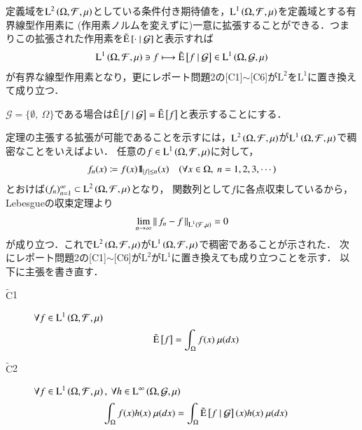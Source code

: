 	\begin{thm}[条件付き期待値の拡張]
		定義域を$\operatorname{L}^{2} \left(\Omega,\mathcal{F},\mu\right)$としている条件付き期待値を，$\operatorname{L}^{1} \left(\Omega,\mathcal{F},\mu\right)$を定義域とする有界線型作用素に
		(作用素ノルムを変えずに)一意に拡張することができる．つまりこの拡張された作用素を$\tilde{\operatorname{E}} \left[ \cdot \ \middle|\ \mathcal{G} \right]$と表示すれば
		\begin{align}
			\operatorname{L}^{1} \left(\Omega,\mathcal{F},\mu\right) \ni f \longmapsto \tilde{\operatorname{E}} \left[ f \ \middle|\ \mathcal{G} \right] \in \operatorname{L}^{1} \left(\Omega,\mathcal{G},\mu\right)
		\end{align}
		が有界な線型作用素となり，更にレポート問題2の[C1]$\sim$[C6]が$\mathrm{L}^2$を$\mathrm{L}^1$に置き換えて成り立つ．
	\end{thm}
	$\mathcal{G} = \{\emptyset,\ \Omega\}$である場合は$\tilde{\operatorname{E}} \left[ f \ \middle|\ \mathcal{G} \right] = \tilde{\operatorname{E}} \left[ f \right]$と表示することにする．
	\begin{prf}	
		定理の主張する拡張が可能であることを示すには，$\operatorname{L}^{2} \left(\Omega,\mathcal{F},\mu\right)$が$\operatorname{L}^{1} \left(\Omega,\mathcal{F},\mu\right)$で稠密なことをいえばよい．
		任意の$f \in \operatorname{L}^{1} \left(\Omega,\mathcal{F},\mu\right)$に対して，
		\begin{align}
			f_n(x) \coloneqq f(x) \mbox{1}\hspace{-0.25em}\mbox{l}_{|f| \leq n} (x) \quad (\forall x \in \Omega,\ n=1,2,3,\cdots)
		\end{align}
		とおけば$(f_n)_{n=1}^{\infty} \subset \operatorname{L}^{2} \left(\Omega,\mathcal{F},\mu\right)$となり，
		関数列として$f$に各点収束しているから，Lebesgueの収束定理より
		\begin{align}
			\lim_{n \to \infty} \left\|\, f_n - f\, \right\|_{\operatorname{L}^{1} \left(\mathcal{F},\mu\right)} = 0
		\end{align}
		が成り立つ．これで$\operatorname{L}^{2} \left(\Omega,\mathcal{F},\mu\right)$が$\operatorname{L}^{1} \left(\Omega,\mathcal{F},\mu\right)$で稠密であることが示された．
		次にレポート問題2の[C1]$\sim$[C6]が$\mathrm{L}^2$が$\mathrm{L}^1$に置き換えても成り立つことを示す．
		以下に主張を書き直す．
		\begin{description}
			\item[$\tilde{\mathrm{C}}$1] $\forall f \in \operatorname{L}^{1} \left(\Omega, \mathcal{F},\mu\right)$
				\begin{align}
					\tilde{\operatorname{E}} \left[ f \right] = \int_{\Omega} f(x)\ \mu(dx)
				\end{align}
				
			\item[$\tilde{\mathrm{C}}$2]	$\forall f \in \operatorname{L}^{1} \left(\Omega, \mathcal{F},\mu\right),\ \forall h \in \operatorname{L}^{\infty} \left(\Omega, \mathcal{G},\mu\right)$
				\begin{align}
					\int_{\Omega} f(x)h(x)\ \mu(dx) = \int_{\Omega} \tilde{\operatorname{E}} \left[ f \ \middle|\ \mathcal{G} \right](x)h(x)\ \mu(dx)
				\end{align}
				

\end{description}
\end{prf}
